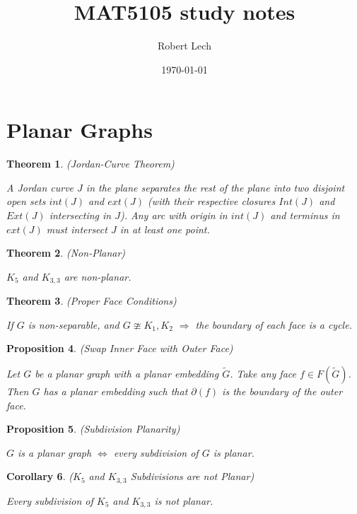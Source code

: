 \documentclass[12pt]{amsart}
\title{MAT5105 study notes}
\author{Robert Lech}
\date{\today}
\newtheorem{thm}{Theorem}
\newtheorem{prop}[thm]{Proposition}
\newtheorem{cor}[thm]{Corollary}
\theoremstyle{definition}
\begin{document}
\maketitle

\section{Planar Graphs}

\begin{thm} (Jordan-Curve Theorem)

A Jordan curve $J$ in the plane separates the rest of the plane into two disjoint open sets $int(J)$ and $ext(J)$ (with their respective closures $Int(J)$ and $Ext(J)$ intersecting in $J$). Any arc with origin in $int(J)$ and terminus in $ext(J)$ must intersect $J$ in at least one point.
\end{thm}


\begin{thm} (Non-Planar)

$K_5$ and $K_{3,3}$ are non-planar.
\end{thm}


\begin{thm} (Proper Face Conditions)

If $G$ is non-separable, and $G\ncong K_1, K_2$ $\Rightarrow$ the boundary of each face is a cycle.
\end{thm}


\begin{prop} (Swap Inner Face with Outer Face)

Let $G$ be a planar graph with a planar embedding $\widetilde{G}$. Take any face $f\in F(\widetilde{G})$. Then $G$ has a planar embedding such that $\partial(f)$ is the boundary of the outer face.
\end{prop}


\begin{prop} (Subdivision Planarity)

$G$ is a planar graph $\Longleftrightarrow$ every subdivision of $G$ is planar.
\end{prop}


\begin{cor} ($K_5$ and $K_{3,3}$ Subdivisions are not Planar)

Every subdivision of $K_5$ and $K_{3,3}$ is not planar.
\end{cor}
\end{document}
